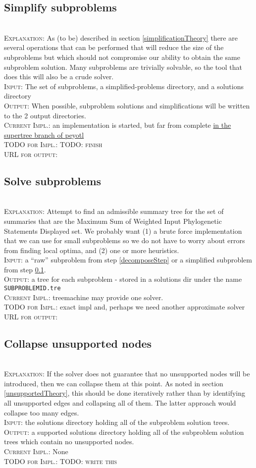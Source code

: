 \documentclass[11pt]{article}
\newcommand{\PSs}{Phylogenetic Statements\xspace}
\newcommand{\SWIPSD}{Sum of Weighted Input \PSs Displayed\xspace}
\newcommand{\MSWIPSD}{Maximum \SWIPSD \xspace}
\newcommand{\stepExplanation}[0]{\\\noindent\textsc{Explanation}:\xspace}
\newcommand{\stepInput}[0]{\\\noindent\textsc{Input}:\xspace}
\newcommand{\stepOutput}[0]{\\\noindent\textsc{Output}:\xspace}
\newcommand{\currImpl}[0]{\\\noindent\textsc{Current Impl.}:\xspace}
\newcommand{\implTODO}[0]{\\\noindent\textsc{TODO for Impl.}:\xspace}
\newcommand{\currURL}[0]{\\\noindent\textsc{URL for output}:\xspace}
\newcommand{\comment}[1]{{\color{red} \textsc{#1}}\xspace}
\newcommand{\TODO}[1]{\comment{TODO: #1}}
\begin{document}
\subsection{Simplify subproblems}\label{simplifyStep}
\stepExplanation As (to be) described in section \ref{simplificationTheory} there
    are several operations that can be performed that will reduce the size of the
    subproblems but which should not compromise our ability to obtain the same
    subproblem solution.
    Many subproblems are trivially solvable, so the tool that does this
    will also be a crude solver.
\stepInput The set of subproblems, a simplified-problems directory, and a solutions directory
\stepOutput When possible, subproblem solutions and simplifications will be written to the 2 output directories.
\currImpl an implementation is started, but far from complete \href{https://github.com/OpenTreeOfLife/peyotl/blob/supertree/scripts/supertree/simplify_subproblems.py}{in the supertree branch of peyotl}
\implTODO \TODO {finish}
\currURL 
 
\subsection{Solve subproblems}
\stepExplanation Attempt to find an admissible summary tree for the set of 
    summaries that are the \MSWIPSD set.
    We probably want (1) a brute force implementation that we can use for small
    subproblems so we do not have to worry about errors from finding local 
    optima, and (2) one or more heuristics.
\stepInput a ``raw'' subproblem from step \ref{decomposeStep} or a simplified 
    subproblem from step \ref{simplifyStep}.
\stepOutput a tree for each subproblem - stored in a solutions dir under the name
    \texttt{SUBPROBLEMID.tre}
\currImpl treemachine may provide one solver.
\implTODO exact impl and, perhaps we need another approximate solver
\currURL 
 
\subsection{Collapse unsupported nodes}
\stepExplanation If the solver does not guarantee that no unsupported nodes will
    be introduced, then we can collapse them at this point.
    As noted in section \ref{unsupportedTheory}, this should be done
    iteratively rather than by identifying all unsupported edges and 
    collapsing all of them.
    The latter approach would collapse too many edges.
\stepInput the solutions directory holding all of the subproblem solution trees.
\stepOutput a supported solutions directory holding all of the subproblem solution trees
    which contain no unsupported nodes.
\currImpl None
\implTODO \TODO{write this}
\end{document}
